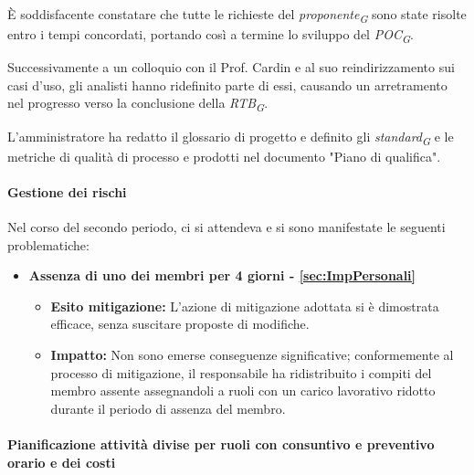È soddisfacente constatare che tutte le richieste del \textit{proponente}\textsubscript{\textit{G}} sono state risolte entro i tempi concordati, portando così a termine lo sviluppo del \textit{POC}\textsubscript{\textit{G}}.

Successivamente a un colloquio con il Prof. Cardin e al suo reindirizzamento sui casi d'uso, gli analisti hanno ridefinito parte di essi, causando un arretramento nel progresso verso la conclusione della \textit{RTB}\textsubscript{\textit{G}}.

L'amministratore ha redatto il glossario di progetto e definito gli \textit{standard}\textsubscript{\textit{G}} e le metriche di qualità di processo e prodotti nel documento "Piano di qualifica".

\paragraph{Gestione dei rischi} 

Nel corso del secondo periodo, ci si attendeva e si sono manifestate le seguenti problematiche:
\begin{itemize}
    \item \textbf{Assenza di uno dei membri per 4 giorni - \ref{sec:ImpPersonali}}
    \begin{itemize}
        \item \textbf{Esito mitigazione:} 
        L'azione di mitigazione adottata si è dimostrata efficace, senza suscitare proposte di modifiche.
        \item \textbf{Impatto:}
        Non sono emerse conseguenze significative; conformemente al processo di mitigazione, il responsabile ha ridistribuito i compiti del membro assente assegnandoli a ruoli con un carico lavorativo ridotto durante il periodo di assenza del membro.
        \end{itemize}
\end{itemize}

\newpage
\paragraph{Pianificazione attività divise per ruoli con consuntivo e preventivo orario e dei costi}\hspace{1pt}

